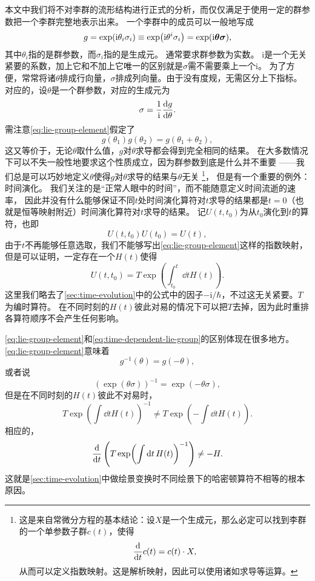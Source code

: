 \documentclass[UTF8, a4paper]{ctexart}
\newcommand*{\ii}{\mathrm{i}}
\begin{document}
本文中我们将不对李群的流形结构进行正式的分析，而仅仅满足于使用一定的群参数把一个李群完整地表示出来。
一个李群中的成员可以一般地写成
\begin{equation}
    g = \exp(\ii \theta_i \sigma_i) \equiv \exp (\ii \theta^i \sigma_i) = \exp (\ii \vb*{\theta} \vb*{\sigma}),
    \label{eq:lie-group-element}
\end{equation}
其中$\theta_i$指的是群参数，而$\sigma_i$指的是生成元。
通常要求群参数为实数。
$\ii$是一个无关紧要的系数，加上它和不加上它唯一的区别就是$\sigma$需不需要乘上一个$\ii$。
为了方便，常常将诸$\theta$排成行向量，$\sigma$排成列向量。由于没有度规，无需区分上下指标。
对应的，设$\theta$是一个群参数，对应的生成元为
\begin{equation}
    \sigma = \frac{1}{\ii} \dv{g}{\theta}.
\end{equation}
需注意\eqref{eq:lie-group-element}假定了
\[
    g(\theta_1) g(\theta_2) = g(\theta_1 + \theta_2),
\]
这又等价于，无论$\theta$取什么值，$g$对$\theta$求导都会得到完全相同的结果。
在大多数情况下可以不失一般性地要求这个性质成立，因为群参数到底是什么并不重要
——我们总是可以巧妙地定义$\theta$使得$g$对$\theta$求导的结果与$\theta$无关%
\footnote{这是来自常微分方程的基本结论：设$X$是一个生成元，那么必定可以找到李群的一个单参数子群$c(t)$，使得
\[
    \dv{t} c(t) = c(t) \cdot X,
\]
从而可以定义指数映射。这是解析映射，因此可以使用诸如求导等运算。}，
但是有一个重要的例外：时间演化。
我们关注的是“正常人眼中的时间”，而不能随意定义时间流逝的速率，
因此并没有什么能够保证不同$t$处时间演化算符对$t$求导的结果都是$t=0$（也就是恒等映射附近）时间演化算符对$t$求导的结果。
记$U(t, t_0)$为从$t_0$演化到$t$的算符，也即
\[
    U(t, t_0) U(t_0) = U(t),
\]
由于$t$不再能够任意选取，我们不能够写出\eqref{eq:lie-group-element}这样的指数映射，但是可以证明，一定存在一个$H(t)$使得
\begin{equation}
    U(t, t_0) = T \exp \left( \int_{t_0}^t \dd{t} H(t) \right).
    \label{eq:time-dependent-lie-group}
\end{equation}
这里我们略去了\autoref{sec:time-evolution}中的公式中的因子$- \ii /\hbar$，不过这无关紧要。$T$为编时算符。
在不同时刻的$H(t)$彼此对易的情况下可以把$T$去掉，因为此时重排各算符顺序不会产生任何影响。

\eqref{eq:lie-group-element}和\eqref{eq:time-dependent-lie-group}的区别体现在很多地方。
\eqref{eq:lie-group-element}意味着
\[
    g^{-1}(\theta) = g(-\theta),
\]
或者说
\[
    \left( \exp(\theta \sigma) \right)^{-1} = \exp(- \theta \sigma),
\]
但是在不同时刻的$H(t)$彼此不对易时，
\[
    T \exp(\int \dd{t} H(t))^{-1} \neq T \exp(- \int \dd{t} H(t)).
\]
相应的，
\[
    \dv{t} \left(T \exp(\int \dd{t} H(t))^{-1}\right) \neq -H.
\]
这就是\autoref{sec:time-evolution}中做绘景变换时不同绘景下的哈密顿算符不相等的根本原因。
\end{document}
